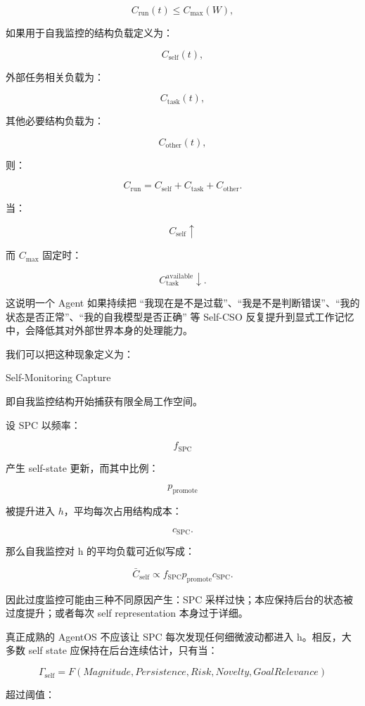\[
C_{\mathrm{run}}(t)
\leq
C_{\max}(W),
\]

如果用于自我监控的结构负载定义为：

\[
C_{\mathrm{self}}(t),
\]

外部任务相关负载为：

\[
C_{\mathrm{task}}(t),
\]

其他必要结构负载为：

\[
C_{\mathrm{other}}(t),
\]

则：

\[
C_{\mathrm{run}}
=
C_{\mathrm{self}}
+
C_{\mathrm{task}}
+
C_{\mathrm{other}}.
\]

当：

\[
C_{\mathrm{self}}\uparrow
\]

而 $C_{\max}$ 固定时：

\[
C_{\mathrm{task}}^{\mathrm{available}}\downarrow.
\]

这说明一个 Agent 如果持续把 ``我现在是不是过载''、``我是不是判断错误''、``我的状态是否正常''、``我的自我模型是否正确'' 等 Self-CSO 反复提升到显式工作记忆中，会降低其对外部世界本身的处理能力。

我们可以把这种现象定义为：

\begin{statementbox}
Self-Monitoring Capture
\end{statementbox}

即自我监控结构开始捕获有限全局工作空间。

设 SPC 以频率：

\[
f_{\mathrm{SPC}}
\]

产生 self-state 更新，而其中比例：

\[
p_{\mathrm{promote}}
\]

被提升进入 $h$，平均每次占用结构成本：

\[
c_{\mathrm{SPC}}.
\]

那么自我监控对 h 的平均负载可近似写成：

\[
\bar C_{\mathrm{self}}
\propto
f_{\mathrm{SPC}}
p_{\mathrm{promote}}
c_{\mathrm{SPC}}.
\]

因此过度监控可能由三种不同原因产生：SPC 采样过快；本应保持后台的状态被过度提升；或者每次 self representation 本身过于详细。

真正成熟的 AgentOS 不应该让 SPC 每次发现任何细微波动都进入 h。相反，大多数 self state 应保持在后台连续估计，只有当：

\[
\Gamma_{\mathrm{self}}
=
F(
Magnitude,
Persistence,
Risk,
Novelty,
GoalRelevance
)
\]

超过阈值：

